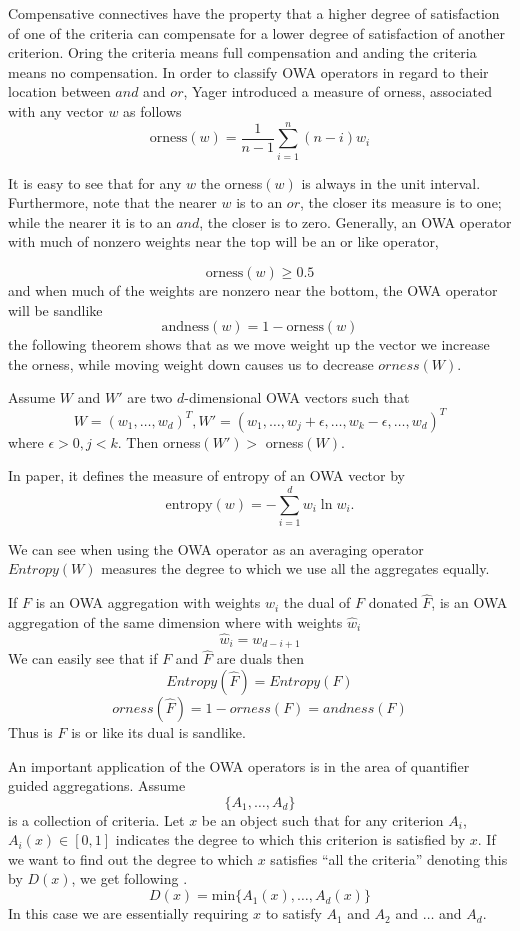 Compensative connectives have the property that a higher degree of satisfaction of one of the criteria can compensate for a lower degree of satisfaction of another criterion. Oring the criteria means full compensation and anding the criteria means no compensation. In order to classify OWA operators in regard to their location between $and$ and $or$, Yager\cite{yager1988ordered} introduced a measure of orness, associated with any vector $w$ as follows 
\[\text{orness}(w) = \frac{1}{n-1}\sum_{i=1}^n (n-i)w_i \]

It is easy to see that for any $w$ the orness$(w)$ is always in the unit interval. Furthermore, note that the nearer $w$ is to an $or$, the closer its measure is to one; while the nearer it is to an $and$, the closer is to zero. Generally, an OWA operator with much of nonzero weights near the top will be an or like operator,

\[\text{orness}(w) \geqslant 0.5\]
and when much of the weights are nonzero near the bottom, the OWA operator will be sandlike
\[\text{andness}(w) = 1- \text{orness}(w) \]
the following theorem shows that as we move weight up the vector we increase the orness, while moving weight down causes us to decrease $orness(W)$.

\begin{theo}
\label{theo:owa}
Assume $W$ and $W'$ are two $d$-dimensional OWA vectors such that
\[W = (w_1,\dots, w_d)^T, W' = (w_1,\dots, w_j+\epsilon,\dots, w_k-\epsilon,\dots,w_d)^T\]
where $\epsilon> 0, j<k$. Then orness$(W') >$ orness$(W)$.
\end{theo}

In paper\cite{yager1988ordered}, it defines the measure of entropy of an OWA vector by 
\[\text{entropy}(w) = - \sum_{i=1}^d w_i \ln{w_i}.\]

We can see when using the OWA operator as an averaging operator $Entropy(W)$ measures the degree to which we use all the aggregates equally.

If $F$ is an OWA aggregation with weights $w_i$ the dual of $F$ donated $\hat{F}$, is an OWA aggregation of the same dimension where with weights $\hat{w}_i$
\[\hat{w}_i = w_{d-i+1}\]
We can easily see that if $F$ and $\hat{F}$ are duals then 
\[Entropy(\hat{F}) = Entropy(F)\]
\[orness(\hat{F}) = 1-orness(F) = andness(F)\]
Thus is $F$ is or like its dual is sandlike.

An important application of the OWA operators is in the area of quantifier guided aggregations\cite{yager1988ordered}. Assume
\[\{A_1,\dots,A_d\}\]
is a collection of criteria. Let $x$ be an object such that for any criterion $A_i$, $A_i(x)\in [0,1]$ indicates the degree to which this criterion is satisfied by $x$. If we want to find out the degree to which $x$ satisfies ``all the criteria'' denoting this by $D(x)$, we get following \cite{bellman1970decision}.
\[D(x) = \text{min}\{A_1(x),\dots,A_d(x)\}\]
In this case we are essentially requiring $x$ to satisfy $A_1$ and $A_2$ and $\dots$ and $A_d$.

